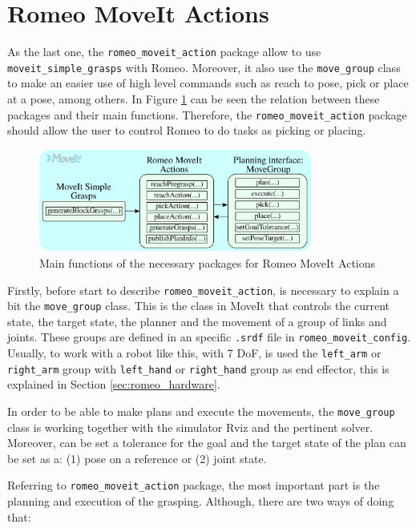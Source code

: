\documentclass[12pt,a4paper,final,twoside,openright]{report}
\begin{document}
\section{Romeo MoveIt Actions}
\label{sec:romeo_moveit_actions}

As the last one, the \texttt{romeo\_moveit\_action} package allow to use \texttt{moveit\_simple\_grasps} with Romeo. Moreover, it also use the \texttt{move\_group} class to make an easier use of high level commands such as reach to pose, pick or place at a pose, among others. In Figure \ref{fig:moveit_internal} can be seen the relation between these packages and their main functions. Therefore, the \texttt{romeo\_moveit\_action} package should allow the user to control Romeo to do tasks as picking or placing.

\begin{figure}[h]
\centering
\includegraphics[width=0.8\textwidth]{images/moveit_internal.eps}
\caption{Main functions of the necessary packages for Romeo MoveIt Actions\label{fig:moveit_internal}}
\end{figure}

Firstly, before start to describe \texttt{romeo\_moveit\_action}, is necessary to explain a bit the \texttt{move\_group} class. This is the class in MoveIt that controls the current state, the target state, the planner and the movement of a group of links and joints. These groups are defined in an specific \texttt{.srdf} file in \texttt{romeo\_moveit\_config}. Usually, to work with a robot like this, with 7 DoF, is used the \texttt{left\_arm} or \texttt{right\_arm} group with \texttt{left\_hand} or \texttt{right\_hand} group as end effector, this is explained in Section \ref{sec:romeo_hardware}.

In order to be able to make plans and execute the movements, the \texttt{move\_group} class is working together with the simulator Rviz and the pertinent solver. Moreover, can be set a tolerance for the goal and the target state of the plan can be set as a: (1) pose on a reference or (2) joint state.

Referring to \texttt{romeo\_moveit\_action} package, the most important part is the planning and execution of the grasping. Although, there are two ways of doing that: 
\end{document}
